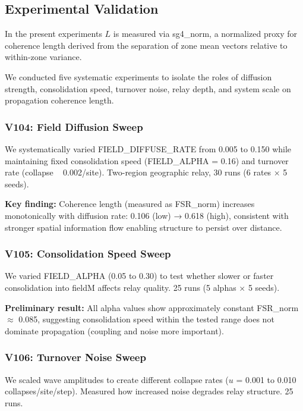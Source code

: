 \documentclass[11pt]{article}
\begin{document}
\subsection{Experimental Validation}

In the present experiments $L$ is measured via sg4\_norm, a normalized proxy for coherence length derived from the separation of zone mean vectors relative to within-zone variance.

We conducted five systematic experiments to isolate the roles of diffusion strength, consolidation speed, turnover noise, relay depth, and system scale on propagation coherence length.

\subsubsection{V104: Field Diffusion Sweep}

We systematically varied FIELD\_DIFFUSE\_RATE from 0.005 to 0.150 while maintaining fixed consolidation speed (FIELD\_ALPHA = 0.16) and turnover rate (collapse ~ 0.002/site). Two-region geographic relay, 30 runs (6 rates × 5 seeds).

\textbf{Key finding:} Coherence length (measured as FSR\_norm) increases monotonically with diffusion rate: 0.106 (low) → 0.618 (high), consistent with stronger spatial information flow enabling structure to persist over distance.

\subsubsection{V105: Consolidation Speed Sweep}

We varied FIELD\_ALPHA (0.05 to 0.30) to test whether slower or faster consolidation into fieldM affects relay quality. 25 runs (5 alphas × 5 seeds).

\textbf{Preliminary result:} All alpha values show approximately constant FSR\_norm $\approx$ 0.085, suggesting consolidation speed within the tested range does not dominate propagation (coupling and noise more important).

\subsubsection{V106: Turnover Noise Sweep}

We scaled wave amplitudes to create different collapse rates ($
u$ = 0.001 to 0.010 collapses/site/step). Measured how increased noise degrades relay structure. 25 runs.
\end{document}
